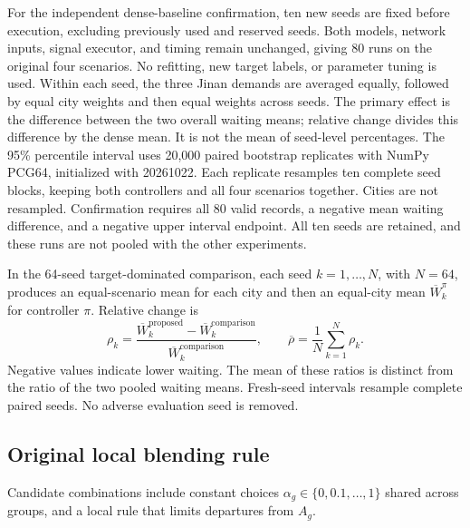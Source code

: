 For the independent dense-baseline confirmation, ten new seeds are fixed before execution, excluding previously used and reserved seeds. Both models, network inputs, signal executor, and timing remain unchanged, giving 80 runs on the original four scenarios. No refitting, new target labels, or parameter tuning is used. Within each seed, the three Jinan demands are averaged equally, followed by equal city weights and then equal weights across seeds. The primary effect is the difference between the two overall waiting means; relative change divides this difference by the dense mean. It is not the mean of seed-level percentages. The 95\% percentile interval uses 20,000 paired bootstrap replicates with NumPy PCG64, initialized with 20261022. Each replicate resamples ten complete seed blocks, keeping both controllers and all four scenarios together. Cities are not resampled. Confirmation requires all 80 valid records, a negative mean waiting difference, and a negative upper interval endpoint. All ten seeds are retained, and these runs are not pooled with the other experiments.

In the 64-seed target-dominated comparison, each seed $k=1,\ldots,N$, with $N=64$, produces an equal-scenario mean for each city and then an equal-city mean $\overline W_k^\pi$ for controller $\pi$. Relative change is
\begin{equation}
 \rho_k=\frac{\overline W_k^{\mathrm{proposed}}-
 \overline W_k^{\mathrm{comparison}}}{\overline W_k^{\mathrm{comparison}}},
 \qquad \overline\rho=\frac{1}{N}\sum_{k=1}^{N}\rho_k.
 \label{eq:relative}
\end{equation}
Negative values indicate lower waiting. The mean of these ratios is distinct from the ratio of the two pooled waiting means. Fresh-seed intervals resample complete paired seeds. No adverse evaluation seed is removed.

\subsection{Original local blending rule}
Candidate combinations include constant choices $\alpha_g\in\{0,0.1,\ldots,1\}$ shared across groups, and a local rule that limits departures from $A_g$.

